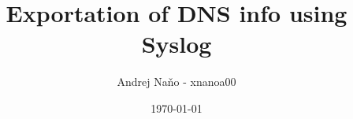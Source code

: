 \documentclass[a4paper,11pt]{article}
\title{Exportation of DNS info using Syslog}
\author{Andrej Naňo - xnanoa00}
\date{\today}
\begin{document}
\newpage
\maketitle
\newpage


\renewcommand{\contentsname}{Table of Content}
\tableofcontents







\end{document}
